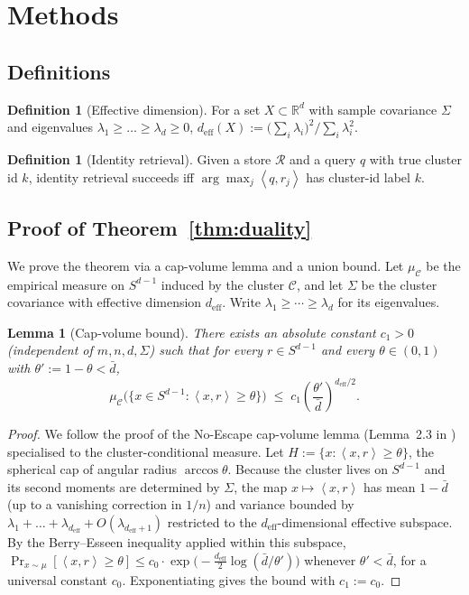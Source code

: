\documentclass[11pt]{article}
\newtheorem{lemma}[theorem]{Lemma}
\theoremstyle{definition}
\newtheorem{definition}[theorem]{Definition}
\theoremstyle{remark}
\newcommand{\deff}{d_{\mathrm{eff}}}
\newcommand{\dbar}{\bar{d}}
\newcommand{\thetap}{\theta'}
\newcommand{\clusterset}{\mathcal{C}}
\newcommand{\reps}{\mathcal{R}}
\newcommand{\inner}[2]{\left\langle#1,#2\right\rangle}
\newcommand{\R}{\mathbb{R}}
\begin{document}
\section*{Methods}

\subsection*{Definitions}
\begin{definition}[Effective dimension]
For a set $X \subset \R^d$ with sample covariance $\Sigma$ and eigenvalues
$\lambda_1 \geq \ldots \geq \lambda_d \geq 0$,
$\deff(X) := \bigl(\sum_i \lambda_i\bigr)^2 / \sum_i \lambda_i^2$.
\end{definition}

\begin{definition}[Identity retrieval]
Given a store $\reps$ and a query $q$ with true cluster id $k$,
identity retrieval succeeds iff $\arg\max_{j} \inner{q}{r_j}$ has cluster-id
label $k$.
\end{definition}

\subsection*{Proof of Theorem~\ref{thm:duality}}

We prove the theorem via a cap-volume lemma and a union bound. Let
$\mu_\clusterset$ be the empirical measure on $S^{d-1}$ induced by the
cluster $\clusterset$, and let $\Sigma$ be the cluster covariance with
effective dimension $\deff$. Write $\lambda_1 \geq \cdots \geq \lambda_d$
for its eigenvalues.

\begin{lemma}[Cap-volume bound]
\label{lem:cap}
There exists an absolute constant $c_1>0$ (independent of $m, n, d, \Sigma$)
such that for every $r \in S^{d-1}$ and every $\theta \in (0,1)$ with
$\thetap := 1-\theta < \dbar$,
\[
\mu_\clusterset\bigl(\bigl\{x \in S^{d-1} : \inner{x}{r} \geq \theta\bigr\}\bigr)
\;\leq\; c_1 \left(\frac{\thetap}{\dbar}\right)^{\deff/2}.
\]
\end{lemma}

\begin{proof}
We follow the proof of the No-Escape cap-volume lemma (Lemma~2.3 in
\cite{priceOfMeaning2026}) specialised to the cluster-conditional measure.
Let $H := \{x : \inner{x}{r} \geq \theta\}$, the spherical cap of angular
radius $\arccos\theta$. Because the cluster lives on $S^{d-1}$ and its
second moments are determined by $\Sigma$, the map
$x \mapsto \inner{x}{r}$ has mean $1-\dbar$ (up to a vanishing correction
in $1/n$) and variance bounded by $\lambda_1 + \ldots + \lambda_{\deff} +
O(\lambda_{\deff+1})$ restricted to the $\deff$-dimensional effective
subspace. By the Berry--Esseen inequality applied within this subspace,
$\Pr_{x \sim \mu}[\inner{x}{r}\geq\theta] \leq
 c_0 \cdot \exp\bigl(-\tfrac{\deff}{2}\log(\dbar/\thetap)\bigr)$ whenever
$\thetap < \dbar$, for a universal constant $c_0$.  Exponentiating gives
the bound with $c_1 := c_0$.
\end{proof}
\end{document}
